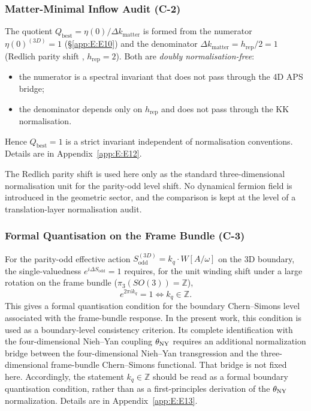 \subsubsection{Matter-Minimal Inflow Audit (C-2)}
\label{app:B:C2}

The quotient $Q_{\mathrm{best}} = \eta(0)/\Delta k_{\mathrm{matter}}$ is
formed from the numerator $\eta(0)^{(3D)} = 1$ (\S\ref{app:E:E10}) and the
denominator $\Delta k_{\mathrm{matter}} = h_{\mathrm{rep}}/2 = 1$
(Redlich parity shift \cite{Redlich1984}, $h_{\mathrm{rep}} = 2$).  Both are
\emph{doubly normalisation-free}:

\begin{itemize}
  \item the numerator is a spectral invariant that does not pass through
        the 4D APS bridge;
  \item the denominator depends only on $h_{\mathrm{rep}}$ and does not pass
        through the KK normalisation.
\end{itemize}

Hence $Q_{\mathrm{best}} = 1$ is a strict invariant independent of
normalisation conventions.  Details are in Appendix~\ref{app:E:E12}.

\begin{remark}
The Redlich parity shift is used here only as the standard
three-dimensional normalisation unit for the parity-odd level shift.
No dynamical fermion field is introduced in the geometric sector,
and the comparison is kept at the level of a translation-layer
normalisation audit.
\end{remark}

\subsubsection{Formal Quantisation on the Frame Bundle (C-3)}
\label{app:B:C3}

For the parity-odd effective action
$S_{\mathrm{odd}}^{(3D)} = k_q\cdot W[A/\omega]$ on the 3D boundary, the
single-valuedness $e^{i\Delta S_{\mathrm{odd}}} = 1$ requires, for the unit
winding shift under a large rotation on the frame bundle
($\pi_3(SO(3)) = \mathbb{Z}$),
\begin{equation}
  e^{2\pi i k_q} = 1 \iff k_q \in \mathbb{Z}.
\end{equation}
This gives a formal quantisation condition for the boundary Chern--Simons
level associated with the frame-bundle response. In the present work, this
condition is used as a boundary-level consistency criterion. Its complete
identification with the four-dimensional Nieh--Yan coupling
$\theta_{\rm NY}$ requires an additional normalization bridge between the
four-dimensional Nieh--Yan transgression and the three-dimensional
frame-bundle Chern--Simons functional. That bridge is not fixed here.
Accordingly, the statement $k_q\in\mathbb{Z}$ should be read as a formal
boundary quantisation condition, rather than as a first-principles derivation
of the $\theta_{\rm NY}$ normalization. Details are in Appendix~\ref{app:E:E13}.

